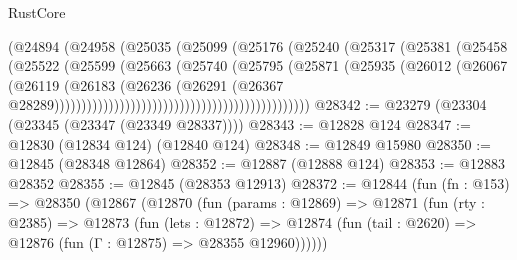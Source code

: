 \begin{lexlean}{RustCore}
\begin{coremodule}
                                                    (@24894
                                                      (@24958
                                                        (@25035
                                                          (@25099
                                                            (@25176
                                                              (@25240
                                                                (@25317
                                                                  (@25381
                                                                    (@25458
                                                                      (@25522
                                                                        (@25599
                                                                          (@25663
                                                                            (@25740
                                                                              (@25795
                                                                                (@25871
                                                                                  (@25935
                                                                                    (@26012
                                                                                      (@26067
                                                                                        (@26119
                                                                                          (@26183
                                                                                            (@26236
                                                                                              (@26291
                                                                                                (@26367
                                                                                                  @28289)))))))))))))))))))))))))))))))))))))))))))))))
@28342 := @23279 (@23304 (@23345 (@23347 (@23349 @28337))))
@28343 := @12828 @124
@28347 := @12830 (@12834 @124) (@12840 @124)
@28348 := @12849 @15980
@28350 := @12845 (@28348 @12864)
@28352 := @12887 (@12888 @124)
@28353 := @12883 @28352
@28355 := @12845 (@28353 @12913)
@28372 := @12844
    (fun (fn : @153) =>
    @28350
      (@12867
        (@12870
          (fun (params : @12869) =>
          @12871
            (fun (rty : @2385) =>
            @12873
              (fun (lets : @12872) =>
              @12874 (fun (tail : @2620) => @12876 (fun (Γ : @12875) => @28355 @12960))))))

\end{coremodule}
\end{lexlean}
